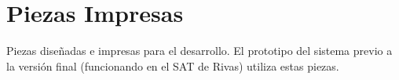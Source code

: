 
\chapter{Piezas Impresas} %

\label{app:piezas} %

Piezas diseñadas e impresas para el desarrollo. El prototipo del sistema previo a la versión final (funcionando en el SAT de Rivas) utiliza estas piezas.

\newpage


